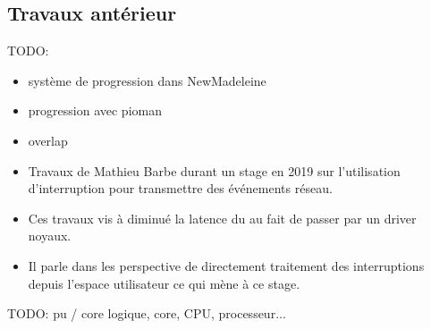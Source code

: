 \subsection{Travaux antérieur}

TODO:

\begin{itemize}
  \item système de progression dans NewMadeleine
  \item progression avec pioman
  \item overlap
  \item Travaux de Mathieu Barbe durant un stage en 2019 sur l'utilisation d'interruption pour transmettre des événements réseau.
  \item Ces travaux vis à diminué la latence du au fait de passer par un driver noyaux.
  \item Il parle dans les perspective de directement traitement des interruptions depuis l'espace utilisateur ce qui mène à ce stage.
\end{itemize}



TODO: pu / core logique, core, CPU, processeur...
